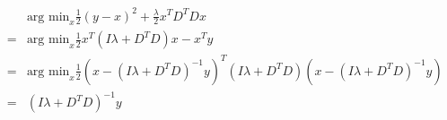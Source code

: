 \documentclass{article}
\begin{document}
\begin{eqnarray}
&&\textrm{arg min}_x \frac{1}{2}(y-x)^2+\frac{\lambda}{2}x^TD^TDx\nonumber\\
&=&\textrm{arg min}_x \frac{1}{2}x^T(I\lambda+D^TD)x-x^Ty\nonumber\\
&=&\textrm{arg min}_x\frac{1}{2}(x-(I\lambda+D^TD)^{-1}y)^T(I\lambda+D^TD)(x-(I\lambda+D^TD)^{-1}y)\nonumber\\
&=&(I\lambda+D^TD)^{-1}y
\end{eqnarray}
\end{document}
